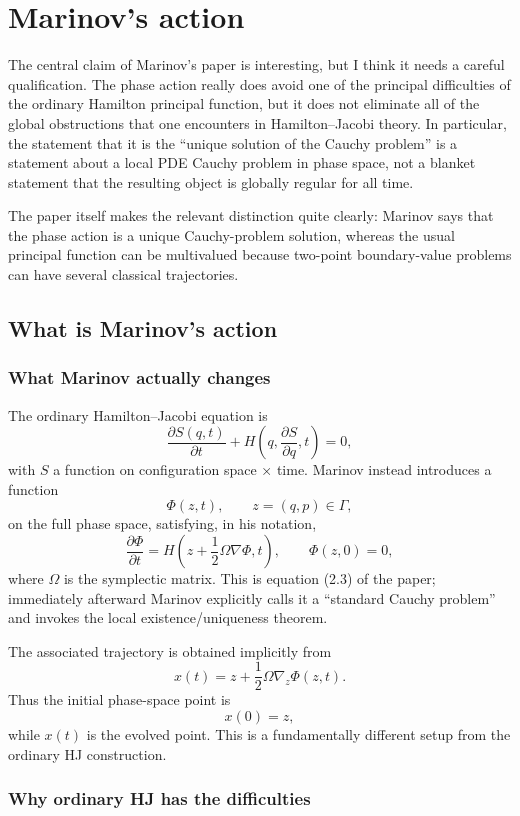 \chapter{Marinov's action}
The central claim of Marinov's paper is interesting, but I think it needs a
careful qualification. The phase action really does avoid one of the principal
difficulties of the ordinary Hamilton principal function, but it does not
eliminate all of the global obstructions that one encounters in Hamilton–Jacobi
theory. In particular, the statement that it is the “unique solution of the
Cauchy problem” is a statement about a local PDE Cauchy problem in phase space,
not a blanket statement that the resulting object is globally regular for all
time.

The paper itself makes the relevant distinction quite clearly: Marinov says
that the phase action is a unique Cauchy-problem solution, whereas the usual
principal function can be multivalued because two-point boundary-value problems
can have several classical trajectories.

\section{What is Marinov's action}
\subsection{What Marinov actually changes}
The ordinary Hamilton–Jacobi equation is
$$ \frac{\partial S(q,t)}{\partial t} + H\left(q,\frac{\partial S}{\partial q},t\right)=0, $$
with \(S\) a function on configuration space × time.
Marinov instead introduces a function
$$ \Phi(z,t),\qquad z=(q,p)\in\Gamma, $$
on the full phase space, satisfying, in his notation,
$$ \frac{\partial\Phi}{\partial t} = 
H\!\left(z+\frac12\Omega\nabla\Phi,t\right), \qquad \Phi(z,0)=0, $$
where \(\Omega\) is the symplectic matrix. This is equation (2.3) of the paper;
immediately afterward Marinov explicitly calls it a “standard Cauchy problem”
and invokes the local existence/uniqueness theorem.

The associated trajectory is obtained implicitly from
$$ x(t)=z+\frac12\Omega\nabla_z\Phi(z,t). $$
Thus the initial phase-space point is
$$ x(0)=z, $$
while \(x(t)\) is the evolved point.
This is a fundamentally different setup from the ordinary HJ construction.

\subsection{ Why ordinary HJ has the difficulties}

